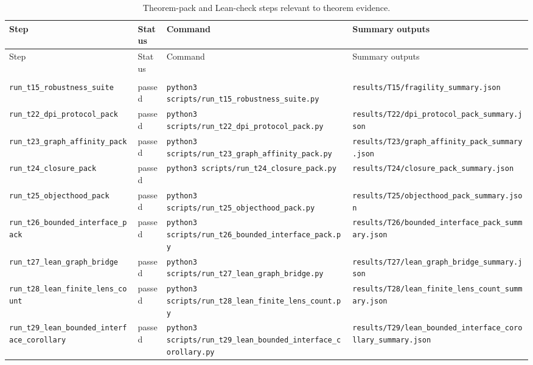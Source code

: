 {\footnotesize
\begin{longtable}{>{\raggedright\arraybackslash}p{} >{\raggedright\arraybackslash}p{} >{\raggedright\arraybackslash}p{} >{\raggedright\arraybackslash}p{}}
\caption{Theorem-pack and Lean-check steps relevant to theorem evidence.}\label{tab:relevant-steps}\\
\toprule
Step & Status & Command & Summary outputs\\
\midrule
\endfirsthead
\toprule
Step & Status & Command & Summary outputs\\
\midrule
\endhead
\midrule
\multicolumn{4}{r}{Continued on next page}\\
\midrule
\endfoot
\bottomrule
\endlastfoot
\texttt{run\_t15\_robustness\_suite} & passed & \texttt{python3 scripts/run\_t15\_robustness\_suite.py} & \texttt{results/T15/fragility\_summary.json}\\
\texttt{run\_t22\_dpi\_protocol\_pack} & passed & \texttt{python3 scripts/run\_t22\_dpi\_protocol\_pack.py} & \texttt{results/T22/dpi\_protocol\_pack\_summary.json}\\
\texttt{run\_t23\_graph\_affinity\_pack} & passed & \texttt{python3 scripts/run\_t23\_graph\_affinity\_pack.py} & \texttt{results/T23/graph\_affinity\_pack\_summary.json}\\
\texttt{run\_t24\_closure\_pack} & passed & \texttt{python3 scripts/run\_t24\_closure\_pack.py} & \texttt{results/T24/closure\_pack\_summary.json}\\
\texttt{run\_t25\_objecthood\_pack} & passed & \texttt{python3 scripts/run\_t25\_objecthood\_pack.py} & \texttt{results/T25/objecthood\_pack\_summary.json}\\
\texttt{run\_t26\_bounded\_interface\_pack} & passed & \texttt{python3 scripts/run\_t26\_bounded\_interface\_pack.py} & \texttt{results/T26/bounded\_interface\_pack\_summary.json}\\
\texttt{run\_t27\_lean\_graph\_bridge} & passed & \texttt{python3 scripts/run\_t27\_lean\_graph\_bridge.py} & \texttt{results/T27/lean\_graph\_bridge\_summary.json}\\
\texttt{run\_t28\_lean\_finite\_lens\_count} & passed & \texttt{python3 scripts/run\_t28\_lean\_finite\_lens\_count.py} & \texttt{results/T28/lean\_finite\_lens\_count\_summary.json}\\
\texttt{run\_t29\_lean\_bounded\_interface\_corollary} & passed & \texttt{python3 scripts/run\_t29\_lean\_bounded\_interface\_corollary.py} & \texttt{results/T29/lean\_bounded\_interface\_corollary\_summary.json}\\

\end{longtable}}
